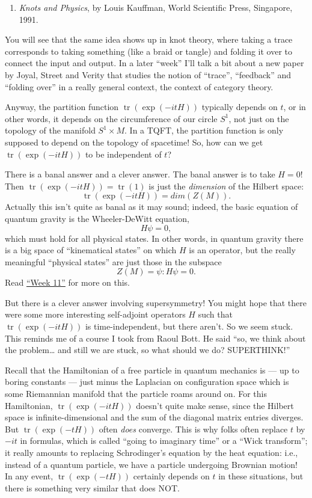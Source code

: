 \documentclass{article}
\def\tightlist{}
\begin{document}
\begin{enumerate}
\def\labelenumi{\arabic{enumi})}
\setcounter{enumi}{3}
\tightlist
\item
  \emph{Knots and Physics}, by Louis Kauffman, World Scientific Press,
  Singapore, 1991.
\end{enumerate}

You will see that the same idea shows up in knot theory, where taking a
trace corresponds to taking something (like a braid or tangle) and
folding it over to connect the input and output. In a later ``week''
I'll talk a bit about a new paper by Joyal, Street and Verity that
studies the notion of ``trace'', ``feedback'' and ``folding over'' in a
really general context, the context of category theory.

Anyway, the partition function \(\operatorname{tr}(\exp(-itH))\)
typically depends on \(t\), or in other words, it depends on the
circumference of our circle \(S^1\), not just on the topology of the
manifold \(S^1\times M\). In a TQFT, the partition function is only
supposed to depend on the topology of spacetime! So, how can we get
\(\operatorname{tr}(\exp(-itH))\) to be independent of \(t\)?

There is a banal answer and a clever answer. The banal answer is to take
\(H = 0\)! Then \(\operatorname{tr}(\exp(-itH)) = \operatorname{tr}(1)\)
is just the \emph{dimension} of the Hilbert space:
\[\operatorname{tr}(\exp(-itH)) = dim(Z(M)).\] Actually this isn't quite
as banal as it may sound; indeed, the basic equation of quantum gravity
is the Wheeler-DeWitt equation, \[H \psi = 0,\] which must hold for all
physical states. In other words, in quantum gravity there is a big space
of ``kinematical states'' on which \(H\) is an operator, but the really
meaningful ``physical states'' are just those in the subspace
\[Z(M) = {\psi: H \psi = 0}.\] Read \protect\hyperlink{week11}{``Week
11''} for more on this.

But there is a clever answer involving supersymmetry! You might hope
that there were some more interesting self-adjoint operators \(H\) such
that \(\operatorname{tr}(\exp(-itH))\) is time-independent, but there
aren't. So we seem stuck. This reminds me of a course I took from Raoul
Bott. He said ``so, we think about the problem\ldots{} and still we are
stuck, so what should we do? SUPERTHINK!''

Recall that the Hamiltonian of a free particle in quantum mechanics is
--- up to boring constants --- just minus the Laplacian on configuration
space which is some Riemannian manifold that the particle roams around
on. For this Hamiltonian, \(\operatorname{tr}(\exp(-itH))\) doesn't
quite make sense, since the Hilbert space is infinite-dimensional and
the sum of the diagonal matrix entries diverges. But
\(\operatorname{tr}(\exp(-tH))\) often \emph{does} converge. This is why
folks often replace \(t\) by \(-it\) in formulas, which is called
``going to imaginary time'' or a ``Wick transform''; it really amounts
to replacing Schrodinger's equation by the heat equation: i.e., instead
of a quantum particle, we have a particle undergoing Brownian motion! In
any event, \(\operatorname{tr}(\exp(-tH))\) certainly depends on \(t\)
in these situations, but there is something very similar that does NOT.
\end{document}
